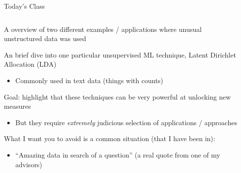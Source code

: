 \documentclass[notes,11pt, aspectratio=169]{beamer}
\newenvironment{wideitemize}{\itemize\addtolength{\itemsep}{10pt}}{\enditemize}
\begin{document}
\begin{frame}{Today's Class}
      \begin{columns}[onlytextwidth, T] %
      \begin{column}{.9\textwidth}
        \begin{wideitemize}
        \item A  overview of two different examples /
          applications where unusual unstructured data was used
        \item An brief dive into one particular unsupervised ML technique, Latent Dirichlet Allocation (LDA)
          \begin{itemize}
          \item Commonly used in text data (things with counts)
          \end{itemize}
        \item Goal: highlight that these techniques can be very powerful at unlocking new measures
          \begin{itemize}
          \item But they require \emph{extremely} judicious selection of applications / approaches 
          \end{itemize}
        \item What I want you to avoid is a common situation (that I have been in):
          \begin{itemize}
          \item ``Amazing data in search of a question'' (a real quote
            from one of my advisors)
          \end{itemize}
        \end{wideitemize}
      \end{column}%
      \hfill%
      \begin{column}{.5\textwidth}
      \end{column}%
    \end{columns}
\end{frame}
\end{document}
